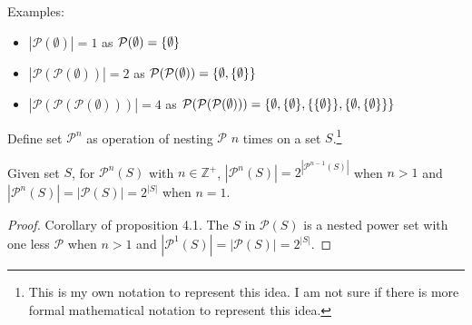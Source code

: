 Examples:
\begin{itemize}
    \item \(|\mathcal{P}(\emptyset)|=1\) as \(\mathcal{P}(\emptyset)=\{\emptyset\}\)
    \item \(|\mathcal{P}(\mathcal{P}(\emptyset))|=2\) as \(\mathcal{P}(\mathcal{P}(\emptyset))=\{\emptyset,\{\emptyset\}\}\)
    \item \(|\mathcal{P}(\mathcal{P}(\mathcal{P}(\emptyset)))|=4\) as \(\mathcal{P}(\mathcal{P}(\mathcal{P}(\emptyset)))=\{\emptyset,\{\emptyset\},\{\{\emptyset\}\},\{\emptyset,\{\emptyset\}\}\}\)
\end{itemize}

\bigskip

Define set \(\mathcal{P}^n\) as operation of nesting \(\mathcal{P}\) \(n\) times on a set \(S\).\footnote{This is my own notation to represent this idea. I am not sure if there is more formal mathematical notation
to represent this idea.}
\begin{proposition} 
    Given set \(S\), for \(\mathcal{P}^n(S)\) with \(n\in\mathbb{Z}^+\), \(|\mathcal{P}^n(S)|=2^{|\mathcal{P}^{n-1}(S)|}\) when \(n>1\) and \(|\mathcal{P}^n(S)|=|\mathcal{P}(S)|=2^{|S|}\) when \(n=1\).
\end{proposition}
\begin{proof}
    Corollary of proposition 4.1. The \(S\) in \(\mathcal{P}(S)\) is a nested power set with one less \(\mathcal{P}\) when \(n>1\) and \(|\mathcal{P}^1(S)|=|\mathcal{P}(S)|=2^{|S|}\).
\end{proof}

